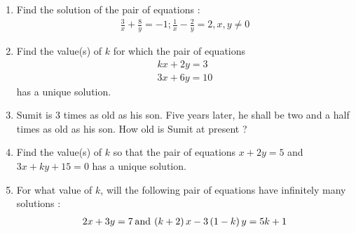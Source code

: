 \begin{enumerate}
\item Find the solution of the pair of equations :
\begin{align*}
    \frac{3}{x}+\frac{8}{y}=-1; \frac{1}{x}-\frac{2}{y}=2, x, y\neq 0
\end{align*}

\item Find the value(s) of $k$ for which the pair of equations
\begin{align*}
    kx+2y=3\\
3x+6y=10
\end{align*}
has a unique solution.
\item Sumit is $3$ times as old as his son. Five years later, he shall be two and a half times as old as his son. How old is Sumit at present ?

 \item Find the value(s) of $k$ so that the pair of equations $x + 2y = 5$ and $3x + ky + 15 = 0$ has a unique solution.

 \item For what value of $k$, will the following pair of equations have infinitely many solutions :
\begin{align*}
	2x + 3y = 7 \hspace{2pt} \text{and} \hspace{2pt} \left(k+2\right)x - 3\left(1-k\right)y = 5k+1 
\end{align*}
\end{enumerate}

